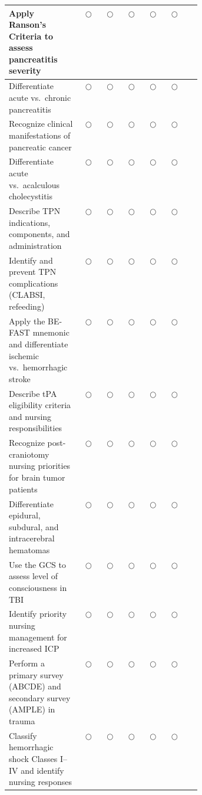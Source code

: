\documentclass[11pt,letterpaper]{article}
\begin{document}
\begin{selfbox}
\begin{center}
\begin{longtable}{|p{0.38\linewidth}|c|c|c|c|c|c|}
\hline
Apply Ranson's Criteria to assess pancreatitis severity & $\bigcirc$ & $\bigcirc$ & $\bigcirc$ & $\bigcirc$ & $\bigcirc$ & \\
\hline
Differentiate acute vs.\ chronic pancreatitis & $\bigcirc$ & $\bigcirc$ & $\bigcirc$ & $\bigcirc$ & $\bigcirc$ & \\
\hline
Recognize clinical manifestations of pancreatic cancer & $\bigcirc$ & $\bigcirc$ & $\bigcirc$ & $\bigcirc$ & $\bigcirc$ & \\
\hline
Differentiate acute vs.\ acalculous cholecystitis & $\bigcirc$ & $\bigcirc$ & $\bigcirc$ & $\bigcirc$ & $\bigcirc$ & \\
\hline
Describe TPN indications, components, and administration & $\bigcirc$ & $\bigcirc$ & $\bigcirc$ & $\bigcirc$ & $\bigcirc$ & \\
\hline
Identify and prevent TPN complications (CLABSI, refeeding) & $\bigcirc$ & $\bigcirc$ & $\bigcirc$ & $\bigcirc$ & $\bigcirc$ & \\
\hline
Apply the BE-FAST mnemonic and differentiate ischemic vs.\ hemorrhagic stroke & $\bigcirc$ & $\bigcirc$ & $\bigcirc$ & $\bigcirc$ & $\bigcirc$ & \\
\hline
Describe tPA eligibility criteria and nursing responsibilities & $\bigcirc$ & $\bigcirc$ & $\bigcirc$ & $\bigcirc$ & $\bigcirc$ & \\
\hline
Recognize post-craniotomy nursing priorities for brain tumor patients & $\bigcirc$ & $\bigcirc$ & $\bigcirc$ & $\bigcirc$ & $\bigcirc$ & \\
\hline
Differentiate epidural, subdural, and intracerebral hematomas & $\bigcirc$ & $\bigcirc$ & $\bigcirc$ & $\bigcirc$ & $\bigcirc$ & \\
\hline
Use the GCS to assess level of consciousness in TBI & $\bigcirc$ & $\bigcirc$ & $\bigcirc$ & $\bigcirc$ & $\bigcirc$ & \\
\hline
Identify priority nursing management for increased ICP & $\bigcirc$ & $\bigcirc$ & $\bigcirc$ & $\bigcirc$ & $\bigcirc$ & \\
\hline
Perform a primary survey (ABCDE) and secondary survey (AMPLE) in trauma & $\bigcirc$ & $\bigcirc$ & $\bigcirc$ & $\bigcirc$ & $\bigcirc$ & \\
\hline
Classify hemorrhagic shock Classes I--IV and identify nursing responses & $\bigcirc$ & $\bigcirc$ & $\bigcirc$ & $\bigcirc$ & $\bigcirc$ & \\

\end{longtable}
\end{center}
\end{selfbox}
\end{document}
